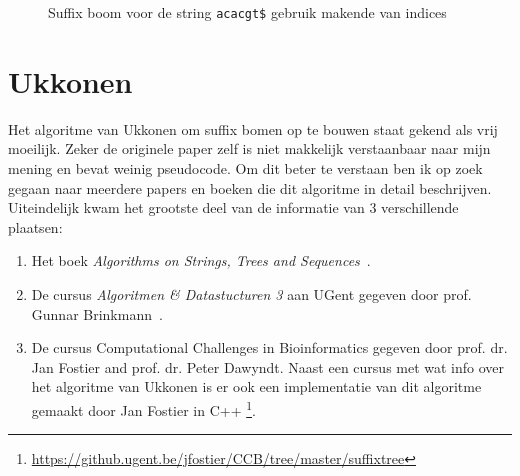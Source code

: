 \begin{figure}[H]
    \center
    \caption{Suffix boom voor de string \texttt{acacgt\$} gebruik makende van indices}\label{fig:suffix_tree_example_indices}

\end{figure}


\section{Ukkonen}\label{sec:Ukkonen}
Het algoritme van Ukkonen om suffix bomen op te bouwen staat gekend als vrij moeilijk.
Zeker de originele paper zelf is niet makkelijk verstaanbaar naar mijn mening en bevat weinig pseudocode.
Om dit beter te verstaan ben ik op zoek gegaan naar meerdere papers en boeken die dit algoritme in detail beschrijven.
Uiteindelijk kwam het grootste deel van de informatie van 3 verschillende plaatsen:
\begin{enumerate}
    \item Het boek \textit{Algorithms on Strings, Trees and Sequences}~\cite{Gusfield1997}.
    \item De cursus \textit{Algoritmen \& Datastucturen 3} aan UGent gegeven door prof. Gunnar Brinkmann~\cite{AD3_ukkonen}.
    \item De cursus Computational Challenges in Bioinformatics gegeven door prof. dr. Jan Fostier and prof. dr. Peter Dawyndt.
    Naast een cursus met wat info over het algoritme van Ukkonen is er ook een implementatie van dit algoritme gemaakt door Jan Fostier in C++ \footnote{\url{https://github.ugent.be/jfostier/CCB/tree/master/suffixtree}}.
\end{enumerate}

